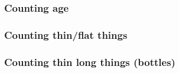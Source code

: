 \documentclass[../nihongo-gakushuu-kyouzai.tex]{subfiles}
\begin{document}
\begin{multicols}{2}
\subsubsection{Counting age}
\begin{center}
\label{tbl:appendix-vocab-nouns-counting-age}
\end{center}


\subsubsection{Counting thin/flat things}
\begin{center}
\label{tbl:appendix-vocab-nouns-counting-thin-flat-things}
\end{center}


\subsubsection{Counting thin long things (bottles)}
\begin{center}
\label{tbl:appendix-vocab-nouns-counting-thin-long-things-bottles}
\end{center}



\end{multicols}
\end{document}
